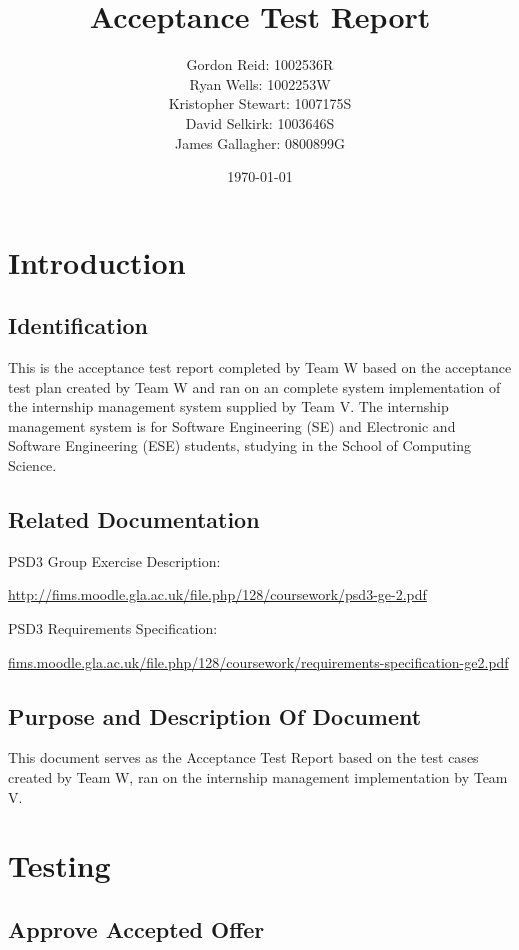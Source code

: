 \documentclass[11pt]{l3deliverable}
\title{Acceptance Test Report}
\author{
    Gordon Reid: 1002536R\\
    Ryan Wells: 1002253W\\
    Kristopher Stewart: 1007175S\\
    David Selkirk: 1003646S\\
    James Gallagher: 0800899G\\
}
\date{\today}
\begin{document}
\maketitle

\newpage

\tableofcontents

\newpage

\section{Introduction}

\subsection{Identification}

This is the acceptance test report completed by Team W based on the acceptance
test plan created by Team W and ran on an complete system implementation
of the internship management system supplied by Team V. The internship
management system is for Software Engineering (SE) and Electronic and
Software Engineering (ESE) students, studying in the School of Computing
Science.

\subsection{Related Documentation}

PSD3 Group Exercise Description:

\url{http://fims.moodle.gla.ac.uk/file.php/128/coursework/psd3-ge-2.pdf}

PSD3 Requirements Specification:

\url{fims.moodle.gla.ac.uk/file.php/128/coursework/requirements-specification-ge2.pdf}

\subsection{Purpose and Description Of Document}

This document serves as the Acceptance Test Report based on the test cases
created by Team W, ran on the internship management implementation by Team V.

\newpage

\section{Testing}

\subsection{Approve Accepted Offer}
\end{document}
